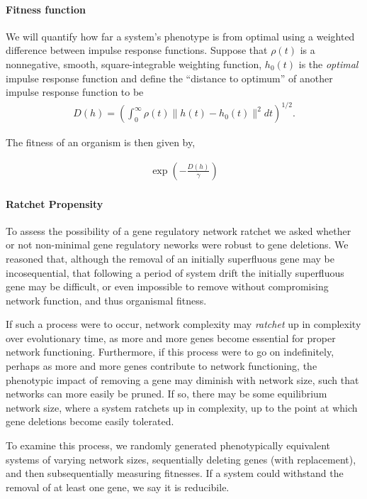 \documentclass{article}
\newcommand{\1}{\mathbbm{1}}
\begin{document}
\paragraph{Fitness function}

We will quantify how far a system's phenotype is from optimal
using a weighted difference between impulse response functions.
Suppose that $\rho(t)$ is a nonnegative, smooth, square-integrable weighting function,
$h_0(t)$ is the \emph{optimal} impulse response function
and define the ``distance to optimum'' of another impulse response function
to be
\begin{align}
\label{eqn:distance}
	D(h) = \left( \int_0^\infty \rho(t) \|h(t) - h_0(t)\|^2 dt \right)^{1/2} .
\end{align}

The fitness of an organism is then given by, 

\begin{align}
  \exp\left(-\frac{D(h)}{\gamma}\right)
\end{align}


\paragraph{Ratchet Propensity}

To assess the possibility of a gene regulatory network ratchet
we asked whether or not non-minimal gene regulatory neworks were robust to gene deletions. 
We reasoned that, although the removal of an initially superfluous gene may be incosequential, that following a period of system drift
the initially superfluous gene may be difficult, or even impossible to remove without compromising network function, and thus
organismal fitness. 

If such a process were to occur, network complexity may \emph{ratchet} up in complexity over evolutionary time, as more and more
genes become essential for proper network functioning. Furthermore, if this process were to go on indefinitely, perhaps as more
and more genes contribute to network functioning, the phenotypic impact of removing a gene may diminish with network size, such that networks can more easily be pruned. 
If so, there may be some equilibrium network size, where a system ratchets up in complexity, up to the point at which gene deletions become easily tolerated.

To examine this process, we randomly generated phenotypically equivalent systems of varying
network sizes, sequentially deleting genes (with replacement), and then subsequentially measuring fitnesses.
If a system could withstand the removal of at least
one gene, we say it is reducibile.
\end{document}
